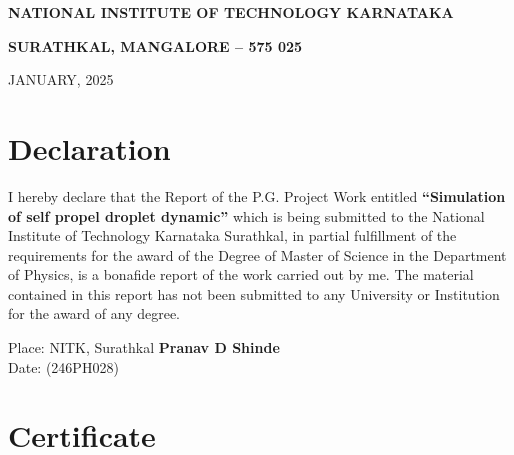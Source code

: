 \documentclass[12pt, a4paper]{report}
\begin{document}
\begin{titlepage}
\vspace{0.2cm}

{\normalsize\bfseries
NATIONAL INSTITUTE OF TECHNOLOGY KARNATAKA
}

\vspace{0.2cm}

{\normalsize\bfseries
SURATHKAL, MANGALORE -- 575 025
}

\vspace{1.0cm}

{\normalsize
JANUARY, 2025
}

\end{titlepage}

\clearpage
{}
\setcounter{page}{1}

\chapter*{Declaration}

\vspace{1cm}

I hereby declare that the Report of the P.G. Project Work entitled \textbf{``Simulation of self propel droplet dynamic''} which is being submitted to the National Institute of Technology Karnataka Surathkal, in partial fulfillment of the requirements for the award of the Degree of Master of Science in the Department of Physics, is a bonafide report of the work carried out by me. The material contained in this report has not been submitted to any University or Institution for the award of any degree.

\vspace{3cm}

\noindent
Place: NITK, Surathkal \hfill \textbf{Pranav D Shinde} \\
Date: \hfill (246PH028)

\clearpage
\addtocounter{page}{1}
\clearpage
\chapter*{Certificate}
\end{document}
